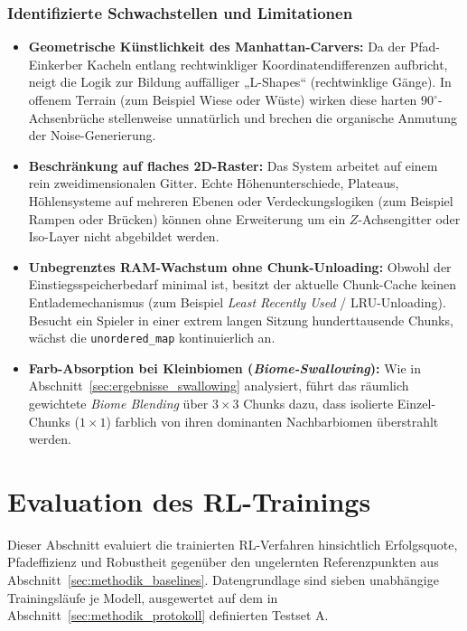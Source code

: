 \documentclass[
  a4paper,
  11pt,
  twoside,
  BCOR=8mm,           %
  headings=big,
  numbers=noenddot,
  listof=totoc,       %
  captions=tableheading,
]{scrreprt}
\begin{document}
\subsubsection{Identifizierte Schwachstellen und Limitationen}
\begin{itemize}
    \item \textbf{Geometrische Künstlichkeit des Manhattan-Carvers:} Da der Pfad-Einkerber Kacheln entlang rechtwinkliger Koordinatendifferenzen aufbricht, neigt die Logik zur Bildung auffälliger „L-Shapes“ (rechtwinklige Gänge). In offenem Terrain (zum Beispiel Wiese oder Wüste) wirken diese harten $90^\circ$-Achsenbrüche stellenweise unnatürlich und brechen die organische Anmutung der Noise-Generierung.
    \item \textbf{Beschränkung auf flaches 2D-Raster:} Das System arbeitet auf einem rein zweidimensionalen Gitter. Echte Höhenunterschiede, Plateaus, Höhlensysteme auf mehreren Ebenen oder Verdeckungslogiken (zum Beispiel Rampen oder Brücken) können ohne Erweiterung um ein $Z$-Achsengitter oder Iso-Layer nicht abgebildet werden.
    \item \textbf{Unbegrenztes RAM-Wachstum ohne Chunk-Unloading:} Obwohl der Einstiegsspeicherbedarf minimal ist, besitzt der aktuelle Chunk-Cache keinen Entlademechanismus (zum Beispiel \textit{Least Recently Used} / LRU-Unloading). Besucht ein Spieler in einer extrem langen Sitzung hunderttausende Chunks, wächst die \texttt{unordered\_map} kontinuierlich an.
    \item \textbf{Farb-Absorption bei Kleinbiomen (\textit{Biome-Swallowing}):} Wie in Abschnitt~\ref{sec:ergebnisse_swallowing} analysiert, führt das räumlich gewichtete \textit{Biome Blending} über $3 \times 3$ Chunks dazu, dass isolierte Einzel-Chunks ($1 \times 1$) farblich von ihren dominanten Nachbarbiomen überstrahlt werden.
\end{itemize}

\section{Evaluation des RL-Trainings}
\label{sec:evalRL}

Dieser Abschnitt evaluiert die trainierten RL-Verfahren hinsichtlich Erfolgsquote, Pfadeffizienz und Robustheit gegenüber den ungelernten Referenzpunkten aus Abschnitt~\ref{sec:methodik_baselines}. Datengrundlage sind sieben unabhängige Trainingsläufe je Modell, ausgewertet auf dem in Abschnitt~\ref{sec:methodik_protokoll} definierten Testset A.
\end{document}
